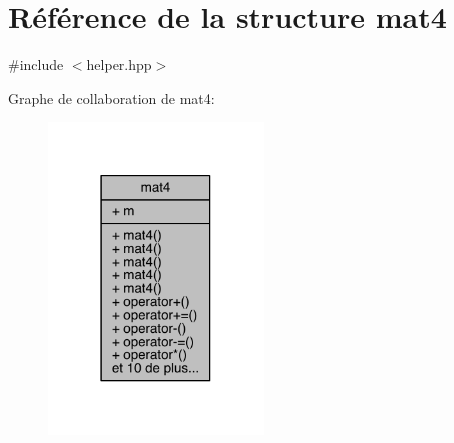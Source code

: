 \hypertarget{structmat4}{\section{Référence de la structure mat4}
\label{structmat4}
}


{\ttfamily \#include $<$helper.\+hpp$>$}



Graphe de collaboration de mat4\+:
\nopagebreak
\begin{figure}[H]
\begin{center}
\leavevmode
\includegraphics[width=162pt]{structmat4__coll__graph}
\end{center}
\end{figure}
